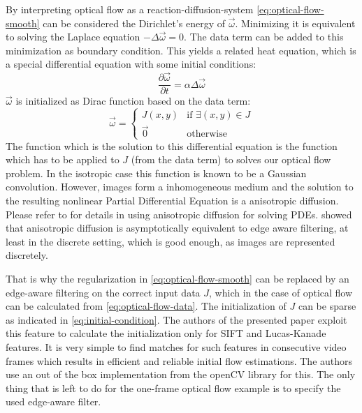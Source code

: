 By interpreting optical flow as a reaction-diffusion-system
\autoref{eq:optical-flow-smooth} can be considered the Dirichlet's energy of
$\vec{\omega}$. Minimizing it is equivalent to solving the Laplace equation
$-\Delta \vec{\omega} = 0$. The data term can be added to this minimization as
boundary condition. This yields a related heat equation, which is a special
differential equation with some initial conditions:
\begin{equation}
  \frac{\partial\vec{\omega}}{\partial t} = \alpha \Delta \vec{\omega}
  \label{eq:heat-equation}
\end{equation}
$\vec{\omega}$ is initialized as Dirac function based on the data term:
\begin{equation}
  \vec{\omega} = \begin{cases}
    J(x, y) & \text{if } \exists (x,y) \in J\\
    \vec{0} & \text{otherwise}
  \end{cases}
  \label{eq:initial-condition}
\end{equation}
The function which is the solution to this differential equation is the function
which has to be applied to $J$ (from the data term) to solves our optical flow
problem. In the isotropic case this function is known to be a Gaussian
convolution. However, images form a inhomogeneous medium and the solution to the
resulting nonlinear Partial Differential Equation is a anisotropic diffusion.
Please refer to \cite{Weickert:1998} for details in using anisotropic diffusion
for solving PDEs. \cite{paris2009bilateral} showed that anisotropic diffusion is
asymptotically equivalent to edge aware filtering, at least in the discrete
setting, which is good enough, as images are represented discretely.

That is why the regularization in \autoref{eq:optical-flow-smooth} can be
replaced by an edge-aware filtering on the correct input data $J$, which in the
case of optical flow can be calculated from \autoref{eq:optical-flow-data}.
The initialization of $J$ can be sparse as indicated in
\autoref{eq:initial-condition}. The authors of the presented paper exploit this
feature to calculate the initialization only for SIFT and Lucas-Kanade features.
It is very simple to find matches for such features in consecutive video frames
which results in efficient and reliable initial flow estimations.  The authors
use an out of the box implementation from the openCV library for this.  The only
thing that is left to do for the one-frame optical flow example is to specify
the used edge-aware filter.

